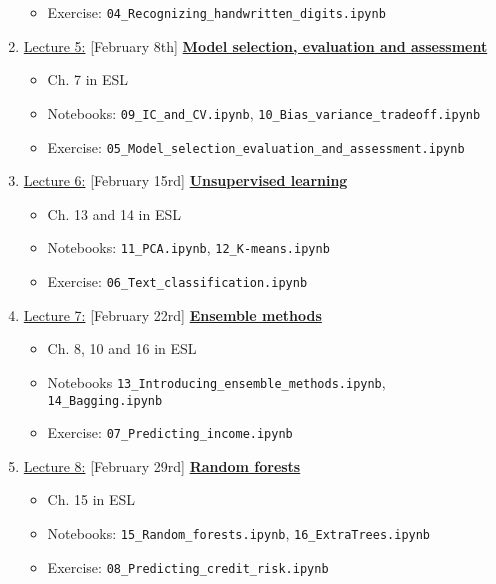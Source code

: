 \documentclass[12pt, a4paper]{article}
\begin{document}
\begin{enumerate}
{\begin{itemize}
                \item Exercise: \texttt{04\_Recognizing\_handwritten\_digits.ipynb}
            \end{itemize}
    }
 \item[] \underline{Lecture 5:} [February 8th] \underline{\bf Model selection, evaluation and assessment}
    {\small
          \begin{itemize}
            \item Ch. 7 in ESL
            \item Notebooks: \texttt{09\_IC\_and\_CV.ipynb}, \texttt{10\_Bias\_variance\_tradeoff.ipynb}
            \item Exercise: \texttt{05\_Model\_selection\_evaluation\_and\_assessment.ipynb}
          \end{itemize}
    }
  \item[] \underline{Lecture 6:} [February 15rd] \underline{\bf Unsupervised learning}
    {\small
          \begin{itemize}
            \item Ch. 13 and 14 in ESL
            \item Notebooks: \texttt{11\_PCA.ipynb}, \texttt{12\_K-means.ipynb}
            \item Exercise: \texttt{06\_Text\_classification.ipynb}
          \end{itemize}
    }
  \item[] \underline{Lecture 7:} [February 22rd] \underline{\bf Ensemble methods}
    {\small
          \begin{itemize}
            \item Ch. 8, 10 and  16 in ESL
            \item Notebooks \texttt{13\_Introducing\_ensemble\_methods.ipynb}, \texttt{14\_Bagging.ipynb}
            \item Exercise: \texttt{07\_Predicting\_income.ipynb}
          \end{itemize}
    }
  \item[] \underline{Lecture 8:} [February 29rd] \underline{\bf Random forests}
    {\small
          \begin{itemize}
            \item Ch. 15 in ESL
            \item Notebooks: \texttt{15\_Random\_forests.ipynb}, \texttt{16\_ExtraTrees.ipynb}
            \item Exercise: \texttt{08\_Predicting\_credit\_risk.ipynb}
          \end{itemize}
}
\end{enumerate}
\end{document}
